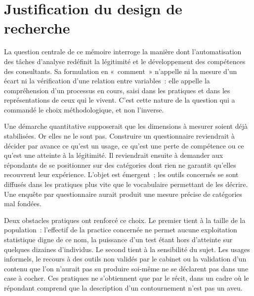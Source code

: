 
\section{Justification du design de recherche}

La question centrale de ce mémoire interroge la manière dont l'automatisation des
tâches d'analyse redéfinit la légitimité et le développement des compétences des
consultants. Sa formulation en «~comment~» n'appelle ni la mesure d'un écart ni la
vérification d'une relation entre variables~: elle appelle la compréhension d'un
processus en cours, saisi dans les pratiques et dans les représentations de ceux qui
le vivent. C'est cette nature de la question qui a commandé le choix méthodologique, et
non l'inverse.

Une démarche quantitative supposerait que les dimensions à mesurer soient déjà
stabilisées. Or elles ne le sont pas. Construire un questionnaire reviendrait à
décider par avance ce qu'est un usage, ce qu'est une perte de compétence ou ce qu'est
une atteinte à la légitimité. Il reviendrait ensuite à demander aux répondants de se
positionner sur des catégories dont rien ne garantit qu'elles recouvrent leur
expérience. L'objet est
émergent~; les outils concernés se sont diffusés dans les pratiques plus vite que le
vocabulaire permettant de les décrire. Une enquête par questionnaire aurait produit une
mesure précise de catégories mal fondées.

Deux obstacles pratiques ont renforcé ce choix. Le premier tient à la taille de la
population~: l'effectif de la practice concernée ne permet aucune exploitation
statistique digne de ce nom, la puissance d'un test étant hors d'atteinte sur quelques
dizaines d'individus. Le second tient à la sensibilité du sujet. Les usages
informels, le recours à des outils non validés par le cabinet ou la validation d'un
contenu que l'on n'aurait pas su produire soi-même ne se déclarent pas dans une case à
cocher. Ces pratiques ne s'obtiennent que par le récit, dans un cadre où le répondant
comprend que la description d'un contournement n'est pas un aveu.


